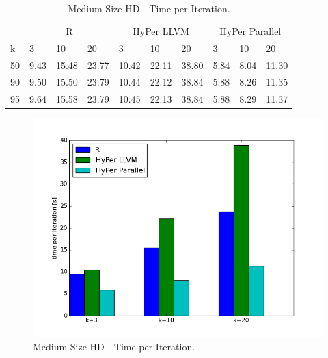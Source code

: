 \begin{table}[htsb]
  \caption[Medium Size HD - Time per Iteration]{Medium Size HD - Time per Iteration.}
  \label{tab:medium_hd_final}
  \centering
  \begin{tabular}{l l l l l l l l l l }
    \toprule
      & \multicolumn{3}{c}{R} & \multicolumn{3}{c}{HyPer LLVM} & \multicolumn{3}{c}{HyPer Parallel}  \\
      k & 3 & 10 & 20 & 3 & 10 & 20 & 3 & 10 & 20 \\
    \midrule
      50  & 9.43 & 15.48 & 23.77 & 10.42 & 22.11 & 38.80 & 5.84 & 8.04 & 11.30 \\
      90  & 9.50 & 15.50 & 23.79 & 10.44 & 22.12 & 38.84 & 5.88 & 8.26 & 11.35 \\
      95  & 9.64 & 15.58 & 23.79 & 10.45 & 22.13 & 38.84 & 5.88 & 8.29 & 11.37 \\
    \bottomrule
  \end{tabular}
\end{table}



\begin{figure}[htsb]
  \centering
  \includegraphics[scale=0.4, trim="0cm 1.5cm 0cm 0cm"]{figures/charts/15Mxhd_final}
  \caption[Medium Size HD - Time per Iteration]{Medium Size HD - Time per Iteration.}
  \label{fig:final_150M}
\end{figure}

